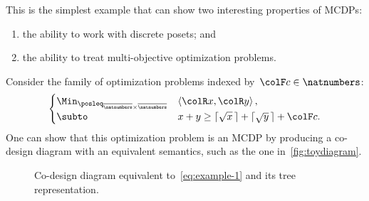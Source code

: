 This is the simplest example that can show two interesting properties
of MCDPs:
\begin{enumerate}
  \item the ability to work with discrete posets; and
  \item the ability to treat multi-objective optimization problems.
\end{enumerate}
Consider the family of optimization problems indexed by~${\colF c}\in\natnumbers$:
\begin{equation}
  \begin{cases}
    \Min_{\posleq_{\overline{\natnumbers}\times\overline{\natnumbers}}} & \left\langle {\colR x},{\colR y}\right\rangle ,\\
    \subto & x+y\geq\lceil\sqrt{x}\,\rceil+\lceil\sqrt{y}\,\rceil+{\colF c}.
  \end{cases}\label{eq:example-1}
\end{equation}
One can show that this optimization problem is an MCDP by producing
a co-design diagram with an equivalent semantics, such as the one
in~\cref{fig:toydiagram}.

\begin{figure}[h]

  \caption{Co-design diagram equivalent to~\cref{eq:example-1} and its tree representation.}
\end{figure}

